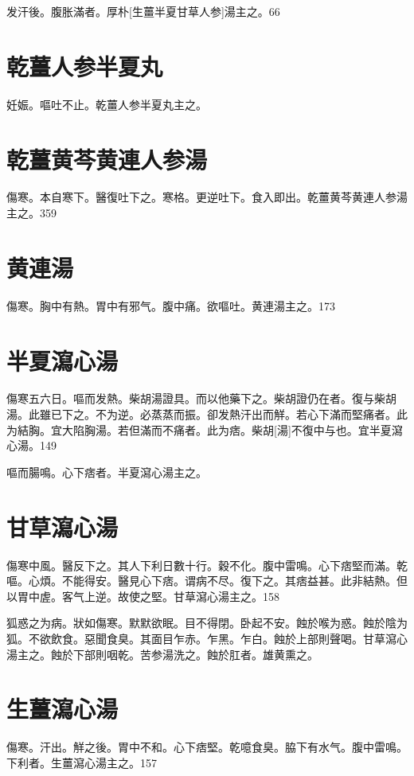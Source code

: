 \documentclass[12pt,twoside,UTF8,b5paper]{ctexbook}
\begin{document}
发汗後。腹胀滿者。厚朴[生薑半夏甘草人参]湯主之。66

\section{乾薑人参半夏丸}

妊娠。嘔吐不止。乾薑人参半夏丸主之。

\section{乾薑黄芩黄連人参湯}

傷寒。本自寒下。醫復吐下之。寒格。更逆吐下。食入即出。乾薑黄芩黄連人参湯主之。359

\section{黄連湯}

傷寒。胸中有熱。胃中有邪气。腹中痛。欲嘔吐。黄連湯主之。173

\section{半夏瀉心湯}

傷寒五六日。嘔而发熱。柴胡湯證具。而以他藥下之。柴胡證仍在者。復与柴胡湯。此雖已下之。不为逆。必蒸蒸而振。卻发熱汗出而觧。若心下滿而堅痛者。此为結胸。宜大陷胸湯。若但滿而不痛者。此为痞。柴胡[湯]不復中与也。宜半夏瀉心湯。149

嘔而腸鳴。心下痞者。半夏瀉心湯主之。

\section{甘草瀉心湯}

傷寒中風。醫反下之。其人下利日數十行。穀不化。腹中雷鳴。心下痞堅而滿。乾嘔。心煩。不能得安。醫見心下痞。谓病不尽。復下之。其痞益甚。此非結熱。但以胃中虗。客气上逆。故使之堅。甘草瀉心湯主之。158

狐惑之为病。狀如傷寒。默默欲眠。目不得閉。卧起不安。蝕於喉为惑。蝕於陰为狐。不欲飲食。惡聞食臭。其面目乍赤。乍黑。乍白。蝕於上部則聲喝。甘草瀉心湯主之。蝕於下部則咽乾。苦参湯洗之。蝕於肛者。雄黄熏之。

\section{生薑瀉心湯}

傷寒。汗出。觧之後。胃中不和。心下痞堅。乾噫食臭。脇下有水气。腹中雷鳴。下利者。生薑瀉心湯主之。157
\end{document}
